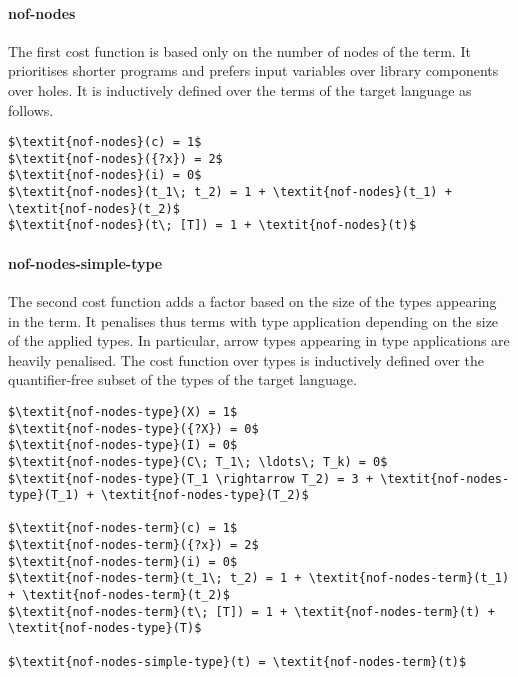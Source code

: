   \paragraph{nof-nodes}
The first cost function is based only on the number of nodes of the term. It prioritises shorter programs and prefers input variables over library components over holes. It is inductively defined over the terms of the target language as follows.
%
\begin{lstlisting}[style=algorithm]
$\textit{nof-nodes}(c) = 1$
$\textit{nof-nodes}({?x}) = 2$
$\textit{nof-nodes}(i) = 0$
$\textit{nof-nodes}(t_1\; t_2) = 1 + \textit{nof-nodes}(t_1) + \textit{nof-nodes}(t_2)$
$\textit{nof-nodes}(t\; [T]) = 1 + \textit{nof-nodes}(t)$
\end{lstlisting}
%
  \paragraph{nof-nodes-simple-type}
The second cost function adds a factor based on the size of the types appearing in the term. It penalises thus terms with type application depending on the size of the applied types. In particular, arrow types appearing in type applications are heavily penalised. The cost function over types is inductively defined over the quantifier-free subset of the types of the target language.
%
\begin{lstlisting}[style=algorithm]
$\textit{nof-nodes-type}(X) = 1$
$\textit{nof-nodes-type}({?X}) = 0$
$\textit{nof-nodes-type}(I) = 0$
$\textit{nof-nodes-type}(C\; T_1\; \ldots\; T_k) = 0$
$\textit{nof-nodes-type}(T_1 \rightarrow T_2) = 3 + \textit{nof-nodes-type}(T_1) + \textit{nof-nodes-type}(T_2)$

$\textit{nof-nodes-term}(c) = 1$
$\textit{nof-nodes-term}({?x}) = 2$
$\textit{nof-nodes-term}(i) = 0$
$\textit{nof-nodes-term}(t_1\; t_2) = 1 + \textit{nof-nodes-term}(t_1) + \textit{nof-nodes-term}(t_2)$
$\textit{nof-nodes-term}(t\; [T]) = 1 + \textit{nof-nodes-term}(t) + \textit{nof-nodes-type}(T)$

$\textit{nof-nodes-simple-type}(t) = \textit{nof-nodes-term}(t)$
\end{lstlisting}

